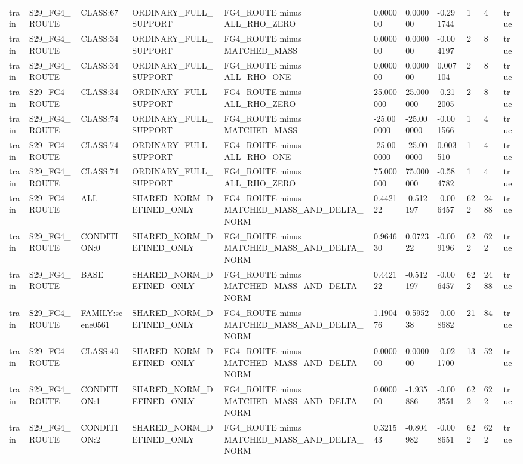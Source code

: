\begin{tabular}{lllllllllll}
train & S29\_FG4\_ROUTE & CLASS:67 & ORDINARY\_FULL\_SUPPORT & FG4\_ROUTE minus ALL\_RHO\_ZERO & 0.000000 & 0.000000 & -0.291744 & 1 & 4 & true \\
train & S29\_FG4\_ROUTE & CLASS:34 & ORDINARY\_FULL\_SUPPORT & FG4\_ROUTE minus MATCHED\_MASS & 0.000000 & 0.000000 & -0.004197 & 2 & 8 & true \\
train & S29\_FG4\_ROUTE & CLASS:34 & ORDINARY\_FULL\_SUPPORT & FG4\_ROUTE minus ALL\_RHO\_ONE & 0.000000 & 0.000000 & 0.007104 & 2 & 8 & true \\
train & S29\_FG4\_ROUTE & CLASS:34 & ORDINARY\_FULL\_SUPPORT & FG4\_ROUTE minus ALL\_RHO\_ZERO & 25.000000 & 25.000000 & -0.212005 & 2 & 8 & true \\
train & S29\_FG4\_ROUTE & CLASS:74 & ORDINARY\_FULL\_SUPPORT & FG4\_ROUTE minus MATCHED\_MASS & -25.000000 & -25.000000 & -0.001566 & 1 & 4 & true \\
train & S29\_FG4\_ROUTE & CLASS:74 & ORDINARY\_FULL\_SUPPORT & FG4\_ROUTE minus ALL\_RHO\_ONE & -25.000000 & -25.000000 & 0.003510 & 1 & 4 & true \\
train & S29\_FG4\_ROUTE & CLASS:74 & ORDINARY\_FULL\_SUPPORT & FG4\_ROUTE minus ALL\_RHO\_ZERO & 75.000000 & 75.000000 & -0.584782 & 1 & 4 & true \\
train & S29\_FG4\_ROUTE & ALL & SHARED\_NORM\_DEFINED\_ONLY & FG4\_ROUTE minus MATCHED\_MASS\_AND\_DELTA\_NORM & 0.442122 & -0.512197 & -0.006457 & 622 & 2488 & true \\
train & S29\_FG4\_ROUTE & CONDITION:0 & SHARED\_NORM\_DEFINED\_ONLY & FG4\_ROUTE minus MATCHED\_MASS\_AND\_DELTA\_NORM & 0.964630 & 0.072322 & -0.009196 & 622 & 622 & true \\
train & S29\_FG4\_ROUTE & BASE & SHARED\_NORM\_DEFINED\_ONLY & FG4\_ROUTE minus MATCHED\_MASS\_AND\_DELTA\_NORM & 0.442122 & -0.512197 & -0.006457 & 622 & 2488 & true \\
train & S29\_FG4\_ROUTE & FAMILY:scene0561 & SHARED\_NORM\_DEFINED\_ONLY & FG4\_ROUTE minus MATCHED\_MASS\_AND\_DELTA\_NORM & 1.190476 & 0.595238 & -0.008682 & 21 & 84 & true \\
train & S29\_FG4\_ROUTE & CLASS:40 & SHARED\_NORM\_DEFINED\_ONLY & FG4\_ROUTE minus MATCHED\_MASS\_AND\_DELTA\_NORM & 0.000000 & 0.000000 & -0.021700 & 13 & 52 & true \\
train & S29\_FG4\_ROUTE & CONDITION:1 & SHARED\_NORM\_DEFINED\_ONLY & FG4\_ROUTE minus MATCHED\_MASS\_AND\_DELTA\_NORM & 0.000000 & -1.935886 & -0.003551 & 622 & 622 & true \\
train & S29\_FG4\_ROUTE & CONDITION:2 & SHARED\_NORM\_DEFINED\_ONLY & FG4\_ROUTE minus MATCHED\_MASS\_AND\_DELTA\_NORM & 0.321543 & -0.804982 & -0.008651 & 622 & 622 & true \\

\end{tabular}
